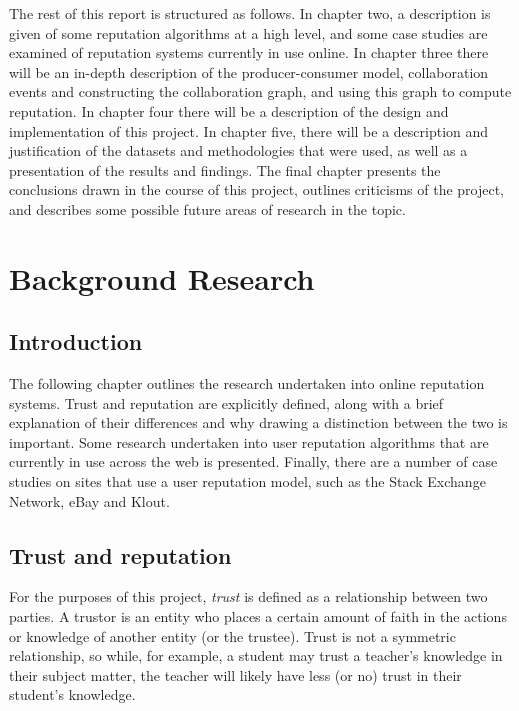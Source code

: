 \documentclass[]{final_report}
\begin{document}
The rest of this report is structured as follows. In chapter two, a description is given of some reputation algorithms at a high level, and some case studies are examined of reputation systems currently in use online. In chapter three there will be an in-depth description of the producer-consumer model, collaboration events and constructing the collaboration graph, and using this graph to compute reputation. In chapter four there will be a description of the design and implementation of this project. In chapter five, there will be a description and justification of the datasets and methodologies that were used, as well as a presentation of the results and findings. The final chapter presents the conclusions drawn in the course of this project, outlines criticisms of the project, and describes some possible future areas of research in the topic.

\chapter{Background Research}


\section{Introduction}

The following chapter outlines the research undertaken into online reputation systems. Trust and reputation are explicitly defined, along with a brief explanation of their differences and why drawing a distinction between the two is important. Some research undertaken into user reputation algorithms that are currently in use across the web is presented. Finally, there are a number of case studies on sites that use a user reputation model, such as the Stack Exchange Network, eBay and Klout.


\section{Trust and reputation}

For the purposes of this project, \textsl{trust} is defined as a relationship between two parties. A trustor is an entity who places a certain amount of faith in the actions or knowledge of another entity (or the trustee). Trust is not a symmetric relationship, so while, for example, a student may trust a teacher's knowledge in their subject matter, the teacher will likely have less (or no) trust in their student's knowledge.
\end{document}
